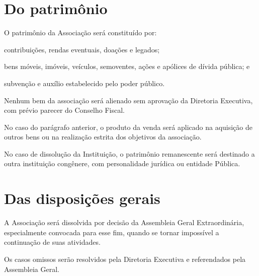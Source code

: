 \documentclass{estatuto}
\begin{document}
\begin{artigos}
		\section{Do patrimônio}
			\item O patrimônio da Associação será constituído por:
				\begin{itens}
					\item contribuições, rendas eventuais, doações e legados;
					\item bens móveis, imóveis, veículos, semoventes, ações e apólices de dívida pública; e
					\item subvenção e auxílio estabelecido pelo poder público.
				\end{itens}
				\begin{paragrafos}
					\item Nenhum bem da associação será alienado sem aprovação da Diretoria Executiva, com prévio parecer do Conselho Fiscal.
					\item No caso do parágrafo anterior, o produto da venda será aplicado na aquisição de outros bens ou na realização estrita dos objetivos da associação.
				\end{paragrafos}
			\item No caso de dissolução da Instituição, o patrimônio remanescente será destinado a outra instituição congênere, com personalidade jurídica ou entidade Pública.
		\section{Das disposições gerais}
			\item A Associação será dissolvida por decisão da Assembleia Geral Extraordinária, especialmente convocada para esse fim, quando se tornar impossível a continuação de suas atividades.
			\item Os casos omissos serão resolvidos pela Diretoria Executiva e referendados pela Assembleia Geral.
	\end{artigos}

	\assinaturas
\end{document}
